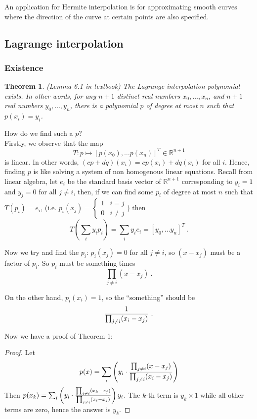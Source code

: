 \documentclass{article} %
\theoremstyle{break}
\newtheorem{thm}[definition]{Theorem}
\begin{document}
  An application for Hermite interpolation is for approximating smooth curves where the direction of the curve at certain points are also specified.

  
  \subsection{Lagrange interpolation}
  \subsubsection{Existence}
  \begin{thm}\label{ext_lag} (Lemma 6.1 in textbook) The Lagrange interpolation polynomial exists. In other words, for any $n+1$ distinct real numbers $x_0,\dots, x_n$, and $n+1$ real numbers $y_0, \dots, y_n$, there is a polynomial $p$ of degree at most $n$ such that $p(x_i)=y_i$.
  \end{thm}
  How do we find such a $p$?\\
  
  Firstly, we observe that the map
  \[T: p\mapsto [p(x_0), \dots p(x_n)]^T\in \mathbb{R}^{n+1}\]
  is linear. In other words, $(cp+dq)(x_i)=cp(x_i)+dq(x_i)$ for all $i$.
  Hence, finding $p$ is like solving a system of non homogenous linear equations. Recall from linear algebra, let $e_i$ be the standard basis vector of $\mathbb{R}^{n+1}$ corresponding to $y_i=1$ and $y_j=0$ for all $j\not=i$, then, if we can find some $p_i$ of degree at most $n$ such that $T(p_i)=e_i$, (i.e. $p_i(x_j)=\begin{cases} 1 & i=j\\ 0 &i\not=j\end{cases}$)  then
  \[T(\sum_iy_ip_i)=\sum_iy_ie_i=[y_0, \dots y_n]^T\ .\]

  
  Now we try and find the $p_i$: $p_i(x_j)=0$ for all $j\not=i$, so $(x-x_j)$ must be a factor of $p_i$. So $p_i$ must be something times
  \[\prod_{j\not=i}(x-x_j)\ .\]

  On the other hand, $p_i(x_i)=1$, so the ``something'' should be
  \[{1\over\prod_{j\not=i}(x_i-x_j)}\ .\]

  Now we have a proof of Theorem 1:

  \begin{proof}
    Let
    \[p(x)=\sum_i\left( y_i\cdot {\prod_{j\not=i}(x-x_j)\over \prod_{j\not=i}(x_i-x_j)}\right)\]
    Then $p(x_k)=\sum_i\left( y_i\cdot {\prod_{j\not=i}(x_k-x_j)\over \prod_{j\not=i}(x_i-x_j)}\right)y_i$. The $k$-th term is $y_k\times 1$ while all other terms are zero, hence the answer is $y_k$.
  \end{proof}
\end{document}
